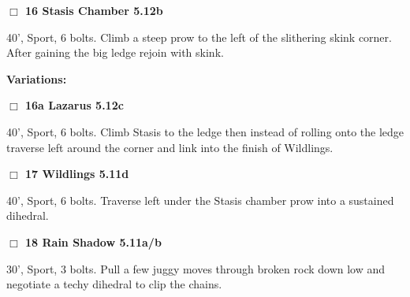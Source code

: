 	\begin{multicols}{2}


\needspace{2em}
\label{rt:Stasis Chamber}
\colorbox{Goldenrod!20}{
\parbox{0.95\linewidth}{
\hspace{-1ex}\textbf{$\Box$
16 Stasis Chamber 5.12b  
}}}
\begin{adjustwidth}{1.3em}{}			

40', Sport, 6 bolts. Climb a steep prow to the left of the slithering skink corner. After gaining the big ledge rejoin with skink.
\end{adjustwidth}


\begin{adjustwidth}{0.5cm}{}				
\needspace{4em}
\textbf{Variations:} \newline

\needspace{2em}
\label{vr:Lazarus}
\colorbox{Goldenrod!20}{
\parbox{0.95\linewidth}{
\hspace{-1ex}\textbf{$\Box$
16a Lazarus 5.12c  
}}}
\begin{adjustwidth}{1.3em}{}			

40', Sport, 6 bolts. Climb Stasis to the ledge then instead of rolling onto the ledge traverse left around the corner and link into the finish of Wildlings.
\end{adjustwidth}



\end{adjustwidth}


\needspace{2em}
\label{rt:Wildlings}
\colorbox{RoyalBlue!20}{
\parbox{0.95\linewidth}{
\hspace{-1ex}\textbf{$\Box$
17 Wildlings 5.11d  
}}}
\begin{adjustwidth}{1.3em}{}			

40', Sport, 6 bolts. Traverse left under the Stasis chamber prow into a sustained dihedral.
\end{adjustwidth}




\needspace{2em}
\label{rt:Rain Shadow}
\colorbox{RoyalBlue!20}{
\parbox{0.95\linewidth}{
\hspace{-1ex}\textbf{$\Box$
18 Rain Shadow 5.11a/b  
}}}
\begin{adjustwidth}{1.3em}{}			

30', Sport, 3 bolts. Pull a few juggy moves through broken rock down low and negotiate a techy dihedral to clip the chains.
\end{adjustwidth}





\end{multicols}

